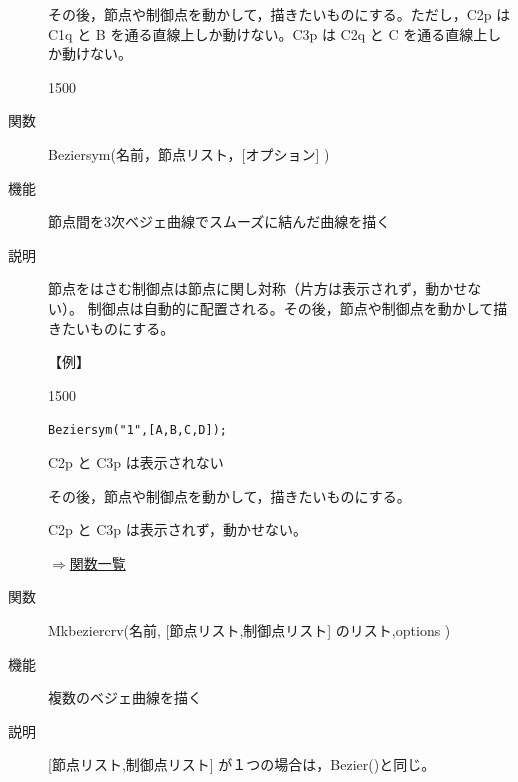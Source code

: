 \documentclass[papersize,a4paper,12pt,uplatex]{jsarticle}
\begin{document}
\begin{description}
\vspace{40mm}
その後，節点や制御点を動かして，描きたいものにする。ただし，C2p は C1q と B を通る直線上しか動けない。C3p は C2q と C を通る直線上しか動けない。

\begin{layer}{150}{0}
\end{layer}

\vspace{35mm}

\vspace{\baselineskip}
\hypertarget{beziersym}{}
\item[関数]Beziersym(名前，節点リスト，[オプション] )
\item[機能]節点間を3次ベジェ曲線でスムーズに結んだ曲線を描く
\item[説明]節点をはさむ制御点は節点に関し対称（片方は表示されず，動かせない）。
制御点は自動的に配置される。その後，節点や制御点を動かして描きたいものにする。

\vspace{\baselineskip}
【例】

\begin{layer}{150}{0}
\end{layer}

\verb|Beziersym("1",[A,B,C,D]);|

C2p と C3p は表示されない

\vspace{25mm}

その後，節点や制御点を動かして，描きたいものにする。

C2p と C3p は表示されず，動かせない。

\begin{center}  \end{center}

\begin{flushright}\hyperlink{functionlist}{$\Rightarrow$関数一覧}\end{flushright}
\hypertarget{mkbeziercrv}{}
\item[関数]Mkbeziercrv(名前, [節点リスト,制御点リスト] のリスト,options )
\item[機能]複数のベジェ曲線を描く
\item[説明][節点リスト,制御点リスト] が１つの場合は，Bezier()と同じ。


\end{description}
\end{document}

